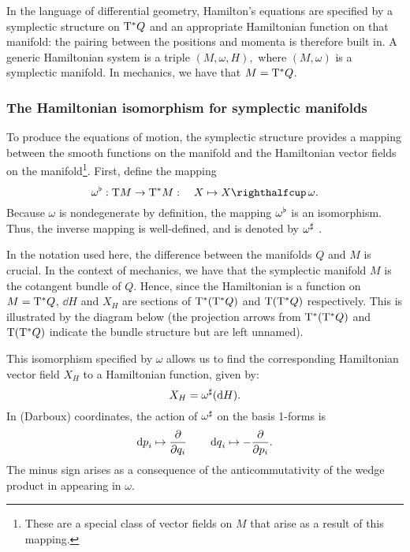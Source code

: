 In the language of differential geometry, Hamilton's equations are specified by a symplectic structure on \(\mathrm{T}^*Q\) and an appropriate Hamiltonian function on that manifold: the pairing between the positions and momenta is therefore built in. A generic Hamiltonian system is a triple \( (M, \omega, H), \) where \( (M, \omega) \) is a symplectic manifold. In mechanics, we have that \( M = \mathrm{T}^*Q \).

\subsubsection{The Hamiltonian isomorphism for symplectic manifolds}
To produce the equations of motion, the symplectic structure provides a mapping between the smooth functions on the manifold and the Hamiltonian vector fields on the manifold\footnote{These are a special class of vector fields on \(M\) that arise as a result of this mapping.}. First, define the mapping 
\begin{equation}
    \toDual{\omega}: \tbundle{M} \to \ctbundle{M}:\quad X \mapsto \intpr{X}{\omega}. 
    \label{eq:symplectic_isomorphism}
\end{equation}
Because \(\omega\) is nondegenerate by definition, the mapping \(\omega^\flat\) is an isomorphism. Thus, the inverse mapping is well-defined, and is denoted by \(\omega^\sharp\) \cite{Libermann1987}.

In the notation used here, the difference between the manifolds \(Q\) and \(M\) is crucial. In the context of mechanics, we have that the symplectic manifold \(M\) is the cotangent bundle of \(Q\). Hence, since the Hamiltonian is a function on \(M = \mathrm{T}^*Q\), \(\dd{H}\) and \(X_H\) are sections of \(\mathrm{T}^*\qty(\mathrm{T}^*Q)\) and \(\mathrm{T}\qty(\mathrm{T}^*Q)\) respectively. This is illustrated by the diagram below (the projection arrows from \(\mathrm{T}^*\qty(\mathrm{T}^*Q)\) and \(\mathrm{T}\qty(\mathrm{T}^*Q)\) indicate the bundle structure but are left unnamed).
\begin{center}
\end{center}
This isomorphism specified by \(\omega\) allows us to find the corresponding Hamiltonian vector field \(X_H\) to a Hamiltonian function, given by:
\begin{equation} 
    X_H = \omega^\sharp(\dd{H}). 
    \label{eq:symplectic_hamiltonian_vf}
\end{equation}
In (Darboux) coordinates, the action of \( \omega^\sharp\) on the basis 1-forms is  
\begin{equation}
     \dd{p}_i \mapsto \pdv{}{q_i} \qquad \dd{q}_i \mapsto -\pdv{}{p_i}.
\end{equation} 
The minus sign arises as a consequence of the anticommutativity of the wedge product in appearing in \(\omega\).

